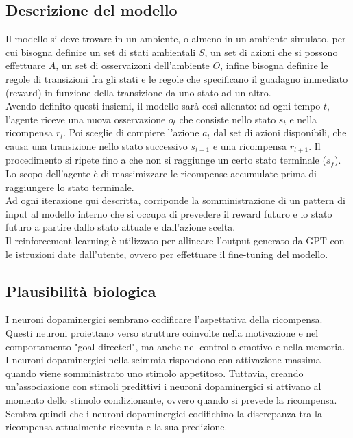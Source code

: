 \subsection{Descrizione del modello}

Il modello si deve trovare in un ambiente, o almeno in un ambiente simulato, per
cui bisogna definire un set di stati ambientali $S$, un set di azioni che si
possono effettuare $A$, un set di osservaizoni dell'ambiente $O$, infine bisogna
definire le regole di transizioni fra gli stati e le regole che specificano il
guadagno immediato (reward) in funzione della transizione da uno stato ad un
altro.\\
Avendo definito questi insiemi, il modello sarà così allenato:
ad ogni tempo $t$, l'agente riceve una nuova osservazione $o_t$ che consiste
nello stato $s_t$ e nella ricompensa $r_t$. Poi sceglie di compiere l'azione
$a_t$ dal set di azioni disponibili, che causa una transizione nello stato
successivo $s_{t+1}$ e una ricompensa $r_{t+1}$. Il procedimento si ripete fino
a che non si raggiunge un certo stato terminale ($s_f$).\\
Lo scopo dell'agente è di massimizzare le ricompense accumulate prima di
raggiungere lo stato terminale.\\
Ad ogni iterazione qui descritta, corriponde la somministrazione di un pattern
di input al modello interno che si occupa di prevedere il reward futuro e lo
stato futuro a partire dallo stato attuale e dall'azione scelta.\\
Il reinforcement learning è utilizzato per allineare l'output generato da GPT
con le istruzioni date dall'utente, ovvero per effettuare il fine-tuning del
modello.\\

\subsection{Plausibilità biologica}

I neuroni dopaminergici sembrano codificare l'aspettativa della ricompensa.
Questi neuroni proiettano verso strutture coinvolte nella motivazione e nel
comportamento "goal-directed", ma anche nel controllo emotivo e nella memoria.\\
I neuroni dopaminergici nella scimmia rispondono con attivazione massima quando
viene somministrato uno stimolo appetitoso. Tuttavia, creando un'associazione
con stimoli predittivi i neuroni dopaminergici si attivano al momento dello
stimolo condizionante, ovvero quando si prevede la ricompensa.
Sembra quindi che i neuroni dopaminergici codifichino la discrepanza tra la
ricompensa attualmente ricevuta e la sua predizione.
